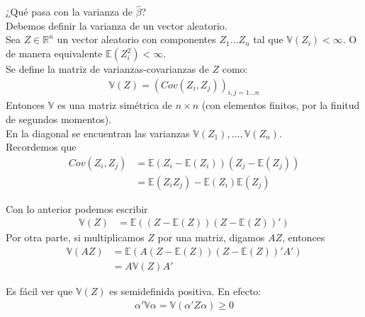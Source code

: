 \documentclass[10pt]{article}
\theoremstyle{plain}
\theoremstyle{definition}
\begin{document}
¿Qué pasa con la varianza de $\hat{\beta}$?\\

Debemos definir la varianza de un vector aleatorio.\\

Sea $Z \in \mathbb{R}^n$ un vector aleatorio con componentes $Z_{1}\ldots Z_{n}$ tal que $\mathbb{V}(Z_{i}) < \infty$. O de manera equivalente $\mathbb{E}(Z_{i}^2) < \infty$.\\

Se define la matriz de varianzas-covarianzas de $Z$ como:
\begin{align*}
\mathbb{V}(Z) = (Cov(Z_{i},Z_{j}))_{i,j = 1\ldots n}
\end{align*}
Entonces $\mathbb{V}$ es una matriz simétrica de $n\times n $ (con elementos finitos, por la finitud de segundos momentos).\\
En la diagonal se encuentran las varianzas $\mathbb{V}(Z_{1}), \ldots ,\mathbb{V}(Z_{n})$.\\

Recordemos que 
\begin{align*}
Cov(Z_{i}, Z_{j}) &= \mathbb{E}(Z_{i}-\mathbb{E} (Z_{i})) (Z_{j}-\mathbb{E} (Z_{j})) \\
&= \mathbb{E}(Z_{i}Z_{j})- \mathbb{E}(Z_{i})\mathbb{E}(Z_{j})
\end{align*}

Con lo anterior podemos escribir
\begin{align*}
\mathbb{V}(Z) &= \mathbb{E}((Z-\mathbb{E}(Z))(Z-\mathbb{E}(Z))')
\end{align*}
Por otra parte, si multiplicamos $Z$ por una matriz, digamos $AZ$, entonces
\begin{align*}
\mathbb{V}(AZ) &= \mathbb{E}(A(Z-\mathbb{E}(Z))(Z-\mathbb{E}(Z))'A')\\
&= A \mathbb{V}(Z)A'
\end{align*}

Es fácil ver que $\mathbb{V}(Z)$ es semidefinida positiva. En efecto:
\begin{align*}
\alpha'\mathbb{V}\alpha = \mathbb{V}(\alpha'Z\alpha) \ge 0
\end{align*}
\end{document}
